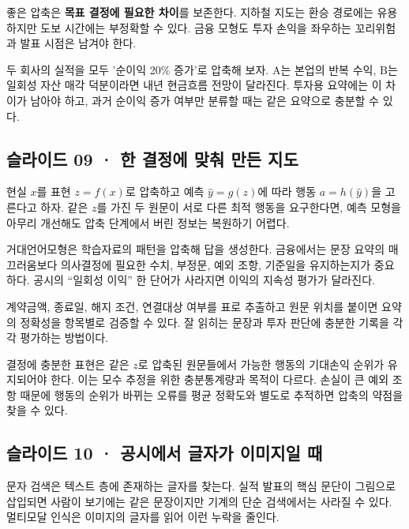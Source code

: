 \documentclass[11pt,a4paper]{article}
\begin{document}
좋은 압축은 \textbf{목표 결정에 필요한 차이}를 보존한다. 지하철 지도는 환승 경로에는 유용하지만 도보 시간에는 부정확할 수 있다. 금융 모형도 투자 손익을 좌우하는 꼬리위험과 발표 시점은 남겨야 한다.\par

두 회사의 실적을 모두 '순이익 20\% 증가'로 압축해 보자. A는 본업의 반복 수익, B는 일회성 자산 매각 덕분이라면 내년 현금흐름 전망이 달라진다. 투자용 요약에는 이 차이가 남아야 하고, 과거 순이익 증가 여부만 분류할 때는 같은 요약으로 충분할 수 있다.\par

\subsection{슬라이드 09 · 한 결정에 맞춰 만든 지도}
현실 $x$를 표현 $z=f(x)$로 압축하고 예측 $\hat y=g(z)$에 따라 행동 $a=h(\hat y)$을 고른다고 하자. 같은 $z$를 가진 두 원문이 서로 다른 최적 행동을 요구한다면, 예측 모형을 아무리 개선해도 압축 단계에서 버린 정보는 복원하기 어렵다.\par

거대언어모형은 학습자료의 패턴을 압축해 답을 생성한다. 금융에서는 문장 요약의 매끄러움보다 의사결정에 필요한 수치, 부정문, 예외 조항, 기준일을 유지하는지가 중요하다. 공시의 “일회성 이익” 한 단어가 사라지면 이익의 지속성 평가가 달라진다.\par

계약금액, 종료일, 해지 조건, 연결대상 여부를 표로 추출하고 원문 위치를 붙이면 요약의 정확성을 항목별로 검증할 수 있다. 잘 읽히는 문장과 투자 판단에 충분한 기록을 각각 평가하는 방법이다.\par

결정에 충분한 표현은 같은 $z$로 압축된 원문들에서 가능한 행동의 기대손익 순위가 유지되어야 한다. 이는 모수 추정을 위한 충분통계량과 목적이 다르다. 손실이 큰 예외 조항 때문에 행동의 순위가 바뀌는 오류를 평균 정확도와 별도로 추적하면 압축의 약점을 찾을 수 있다.\par

\subsection{슬라이드 10 · 공시에서 글자가 이미지일 때}
문자 검색은 텍스트 층에 존재하는 글자를 찾는다. 실적 발표의 핵심 문단이 그림으로 삽입되면 사람이 보기에는 같은 문장이지만 기계의 단순 검색에서는 사라질 수 있다. 멀티모달 인식은 이미지의 글자를 읽어 이런 누락을 줄인다.\par
\end{document}
